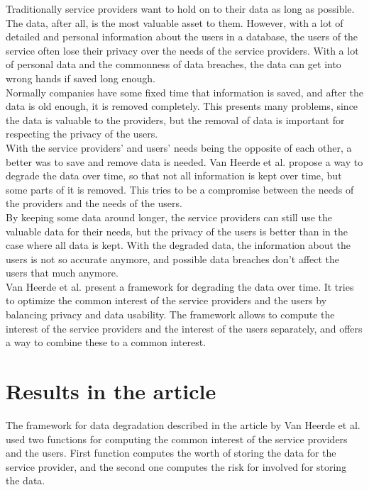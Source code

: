 \documentclass[a4paper,12pt,oneside,fleqn]{article}
\begin{document}
Traditionally service providers want to hold on to their data as long
as possible. The data, after all, is the most valuable asset to
them. However, with a lot of detailed and personal information about
the users in a database, the users of the service often lose their
privacy over the needs of the service providers. With a lot of
personal data and the commonness of data breaches, the data can get
into wrong hands if saved long enough.\\

Normally companies have some fixed time that information is saved, and
after the data is old enough, it is removed completely. This presents
many problems, since the data is valuable to the providers, but the
removal of data is important for respecting the privacy of the
users.\\

With the service providers' and users' needs being the opposite of
each other, a better was to save and remove data is needed. Van Heerde
et al. propose a way to degrade the data over time, so that not all
information is kept over time, but some parts of it is removed. This
tries to be a compromise between the needs of the providers and the
needs of the users.\\

By keeping some data around longer, the service providers can still
use the valuable data for their needs, but the privacy of the users is
better than in the case where all data is kept. With the degraded
data, the information about the users is not so accurate anymore, and
possible data breaches don't affect the users that much anymore.\\

Van Heerde et al. present a framework for degrading the data over
time. It tries to optimize the common interest of the service
providers and the users by balancing privacy and data usability. The
framework allows to compute the interest of the service providers and
the interest of the users separately, and offers a way to combine
these to a common interest.

\section{Results in the article}

The framework for data degradation described in the article by Van
Heerde et al. used two functions for computing the common interest of
the service providers and the users. First function computes the worth
of storing the data for the service provider, and the second one
computes the risk for involved for storing the data.\\
\end{document}
